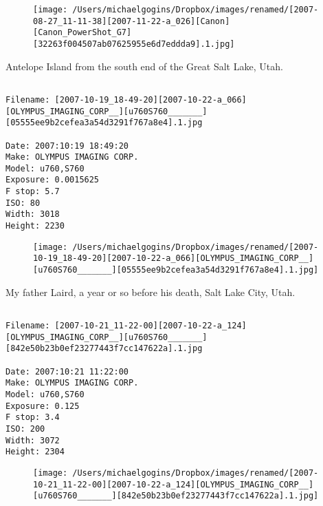 \documentclass[11pt,letter,DIV=14,paper=landscape]{scrbook}
\begin{document}
\begin{figure}
\texttt{[image: /Users/michaelgogins/Dropbox/images/renamed/[2007-08-27\_11-11-38][2007-11-22-a\_026][Canon][Canon\_PowerShot\_G7][32263f004507ab07625955e6d7eddda9].1.jpg]}
\end{figure}
    
\clearpage
\noindent Antelope Island from the south end of the Great Salt Lake, Utah.
\noindent
\begin{lstlisting}

Filename: [2007-10-19_18-49-20][2007-10-22-a_066][OLYMPUS_IMAGING_CORP__][u760S760_______][05555ee9b2cefea3a54d3291f767a8e4].1.jpg

Date: 2007:10:19 18:49:20
Make: OLYMPUS IMAGING CORP.  
Model: u760,S760       
Exposure: 0.0015625
F stop: 5.7
ISO: 80
Width: 3018
Height: 2230
\end{lstlisting}
\clearpage

\begin{figure}
\texttt{[image: /Users/michaelgogins/Dropbox/images/renamed/[2007-10-19\_18-49-20][2007-10-22-a\_066][OLYMPUS\_IMAGING\_CORP\_\_][u760S760\_\_\_\_\_\_\_][05555ee9b2cefea3a54d3291f767a8e4].1.jpg]}
\end{figure}
    
\clearpage
\noindent My father Laird, a year or so before his death, Salt Lake City, Utah.
\noindent
\begin{lstlisting}

Filename: [2007-10-21_11-22-00][2007-10-22-a_124][OLYMPUS_IMAGING_CORP__][u760S760_______][842e50b23b0ef23277443f7cc147622a].1.jpg

Date: 2007:10:21 11:22:00
Make: OLYMPUS IMAGING CORP.  
Model: u760,S760       
Exposure: 0.125
F stop: 3.4
ISO: 200
Width: 3072
Height: 2304
\end{lstlisting}
\clearpage

\begin{figure}
\texttt{[image: /Users/michaelgogins/Dropbox/images/renamed/[2007-10-21\_11-22-00][2007-10-22-a\_124][OLYMPUS\_IMAGING\_CORP\_\_][u760S760\_\_\_\_\_\_\_][842e50b23b0ef23277443f7cc147622a].1.jpg]}
\end{figure}
    
\end{document}
